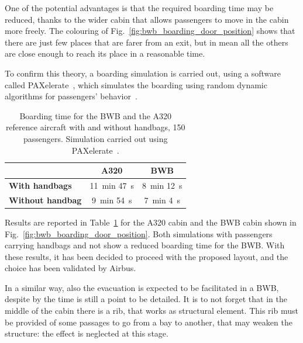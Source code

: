 One of the potential advantages is that the required boarding time may be reduced, thanks to the wider cabin that allows passengers to move in the cabin more freely. 
The colouring of Fig.~\ref{fig:bwb_boarding_door_position} shows that there are just few places that are farer from an exit, but in mean all the others are close enough to reach its place in a reasonable time. 

To confirm this theory, a boarding simulation is carried out, using a software called PAXelerate~\cite{bib:schmidt_2016}, which simulates the boarding using random dynamic algorithms for passengers' behavior~\cite{bib:macal}.
\begin{table}[!h]
	\centering
	\begin{tabular}{l c c}
		\hline
		& \textbf{A320} & \textbf{BWB} \\
		\hline
		\textbf{With handbags} & 11~\si{\minute} 47~\si{\second}  & 8~\si{\minute} 12~\si{\second} \\
		\textbf{Without handbag} & 9~\si{\minute} 54~\si{\second} & 7~\si{\minute} 4~\si{\second} \\
		\hline
	\end{tabular}
	\caption{Boarding time for the BWB and the A320 reference aircraft with and without handbags, 150 passengers. Simulation carried out using PAXelerate~\cite{bib:schmidt_2016}.}
	\label{tab:bwb_boarding_time_comparison}
\end{table}
Results are reported in Table~\ref{tab:bwb_boarding_time_comparison} for the A320 cabin and the BWB cabin shown in Fig.~\ref{fig:bwb_boarding_door_position}.
Both simulations with passengers carrying handbags and not show a reduced boarding time for the BWB.
With these results, it has been decided to proceed with the proposed layout, and the choice has been validated by Airbus. 

In a similar way, also the evacuation is expected to be facilitated in a BWB, despite by the time is still a point to be detailed. 
It is to not forget that in the middle of the cabin there is a rib, that works as structural element. 
This rib must be provided of some passages to go from a bay to another, that may weaken the structure: the effect is neglected at this stage. 

